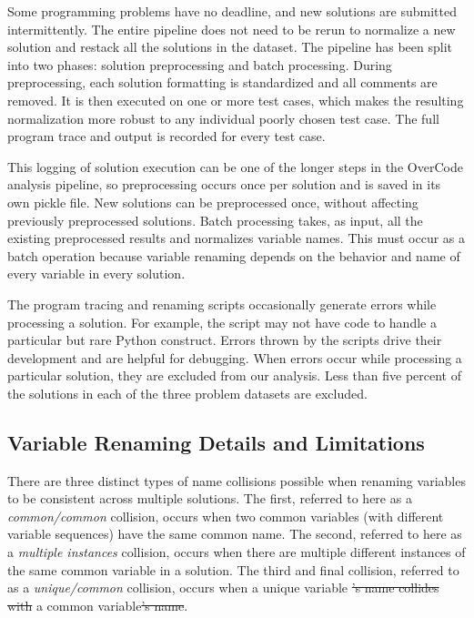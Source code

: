 \documentclass[12pt,twoside]{mitthesis}
\providecommand{\DIFaddtex}[1]{{\protect\color{blue}\uwave{#1}}} %
\providecommand{\DIFdeltex}[1]{{\protect\color{red}\sout{#1}}}                      %
\providecommand{\DIFaddbegin}{} %
\providecommand{\DIFaddend}{} %
\providecommand{\DIFdelbegin}{} %
\providecommand{\DIFdelend}{} %
\providecommand{\DIFadd}[1]{\texorpdfstring{\DIFaddtex{#1}}{#1}} %
\providecommand{\DIFdel}[1]{\texorpdfstring{\DIFdeltex{#1}}{}} %
\begin{document}
Some programming problems have no deadline, and new solutions are submitted intermittently. The entire pipeline does not need to be rerun to normalize a new solution and restack all the solutions in the dataset. The pipeline has been split into two phases: solution preprocessing and batch processing. During preprocessing, each solution formatting is standardized and all comments are removed. It is then executed on one or more test cases, which makes the resulting normalization more robust to any individual poorly chosen test case. The full program trace and output is recorded for every test case. 

This logging of solution execution can be one of the longer steps in the OverCode analysis pipeline, so preprocessing occurs once per solution and is saved in its own pickle file. New solutions can be preprocessed once, without affecting previously preprocessed solutions. Batch processing takes, as input, all the existing preprocessed results and normalizes variable names. This must occur as a batch operation because variable renaming depends on the behavior and name of every variable in every solution.

The program tracing \cite{pgbovineOPT} and renaming scripts occasionally generate errors while processing a solution. For example, the script may not have code to handle a particular but rare Python construct. Errors thrown by the scripts drive their development and are helpful for debugging. When errors occur while processing a particular solution, they are excluded from our analysis. Less than five percent of the solutions in each of the three problem datasets are excluded.

\subsection{Variable Renaming Details and Limitations} \label{repercussions}

There are three distinct types of name collisions possible when renaming variables to be consistent across multiple solutions. The first, referred to here as a {\it common/common} collision, occurs when two common variables (with different variable sequences) have the same common name. The second, referred to here as a {\it multiple instances} collision, occurs when there are multiple different instances of the same common variable in a solution. The third and final collision, referred to as a {\it unique/common} collision, occurs when \DIFaddbegin \DIFadd{the name of }\DIFaddend a unique variable \DIFdelbegin \DIFdel{'s name collides with }\DIFdelend \DIFaddbegin \DIFadd{collides with the name of }\DIFaddend a common variable\DIFdelbegin \DIFdel{'s name}\DIFdelend .
\end{document}
